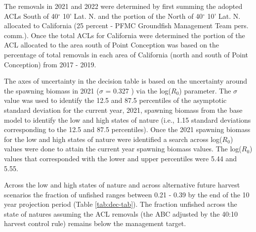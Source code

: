 \documentclass[11pt,
  english,
  a4paper,
]{article}
\begin{document}
\leavevmode\tagmcend\tagstructend\par


The removals in 2021 and 2022 were determined by first summing the adopted ACLs South of 40{\(^\circ\)\leavevmode\tagmcend\tagstructend} 10' Lat. N. and the portion of the North of 40{\(^\circ\)\leavevmode\tagmcend\tagstructend} 10' Lat. N. allocated to California (25 percent - PFMC Groundfish Management Team pers. comm.). Once the total ACLs for California were determined the portion of the ACL allocated to the area south of Point Conception was based on the percentage of total removals in each area of California (north and south of Point Conception) from 2017 - 2019.

\leavevmode\tagmcend\tagstructend\par


The axes of uncertainty in the decision table is based on the uncertainty around the spawning biomass in 2021 ({\(\sigma\)\leavevmode\tagmcend\tagstructend} = 0.327 ) via the log({\(R_0\)\leavevmode\tagmcend\tagstructend}) parameter. The {\(\sigma\)\leavevmode\tagmcend\tagstructend} value was used to identify the 12.5 and 87.5 percentiles of the asymptotic standard deviation for the current year, 2021, spawning biomass from the base model to identify the low and high states of nature (i.e., 1.15 standard deviations corresponding to the 12.5 and 87.5 percentiles). Once the 2021 spawning biomass for the low and high states of nature were identified a search across log({\(R_0\)\leavevmode\tagmcend\tagstructend}) values were done to attain the current year spawning biomass values. The log({\(R_0\)\leavevmode\tagmcend\tagstructend}) values that corresponded with the lower and upper percentiles were 5.44 and 5.55.

\leavevmode\tagmcend\tagstructend\par


Across the low and high states of nature and across alternative future harvest scenarios the fraction of unfished ranges between 0.21 - 0.39 by the end of the 10 year projection period (Table \ref{tab:dec-tab}). The fraction unfished across the state of natures assuming the ACL removals (the ABC adjusted by the 40:10 harvest control rule) remains below the management target.
\end{document}
